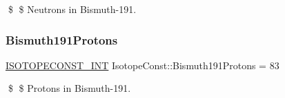 \$ \$ Neutrons in Bismuth-\/191. \mbox{\label{group___isotope_const-_bismuth-_bi191_ga0da0d835cf2452d578405e5e2497db56}} 
\subsubsection{\texorpdfstring{Bismuth191\+Protons}{Bismuth191Protons}}
{\footnotesize\ttfamily \mbox{\hyperlink{group___isotope_const-_macros_ga5f18360b3e99483a35c32d789e62621c}{I\+S\+O\+T\+O\+P\+E\+C\+O\+N\+S\+T\+\_\+\+I\+NT}} Isotope\+Const\+::\+Bismuth191\+Protons = 83}

\$ \$ Protons in Bismuth-\/191. 